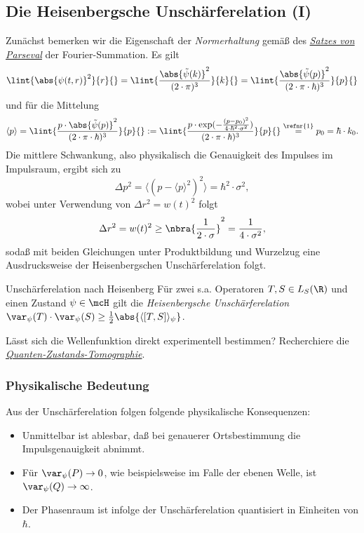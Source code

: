 \documentclass{subfiles}
\begin{document}
    \subsection{Die Heisenbergsche Unschärferelation (I)}
        Zunächst bemerken wir die Eigenschaft der \emph{Normerhaltung} gemäß des \href{https://de.wikipedia.org/wiki/Satz_von_Parseval}{\emph{Satzes von Parseval}} der Fourier-Summation. Es gilt 
        \[
            \lint{\abs{\psi(t,r)}^2}{r}{} = \lint{\frac{\abs{\tilde\psi(k)}^2}{(2\cdot\pi)^3}}{k}{} = \lint{\frac{\abs{\tilde\psi(p)}^2}{(2\cdot\pi\cdot\hbar)^3}}{p}{}
        \]
        und für die Mittelung
        \[\langle p\rangle = \lint{\frac{p\cdot\abs{\tilde\psi(p)}^2}{(2\cdot\pi\cdot\hbar)^3}}{p}{} := \lint{\frac{p\cdot\exp(-\frac{(p-p_0)^2}{4\cdot\hbar^2\cdot\sigma^2})}{(2\cdot\pi\cdot\hbar)^3}}{p}{} \stackrel{\refnr{1}}{=} p_0 = \hbar\cdot k_0.\]
        Die mittlere Schwankung, also physikalisch die Genauigkeit des Impulses im Impulsraum, ergibt sich zu
        \[\Delta p^2 = \langle (p-\langle p\rangle^2)^2\rangle = \hbar^2\cdot\sigma^2,\]
        wobei unter Verwendung von $\Delta r^2 = w(t)^2$ folgt
        \[\Delta r^2 = w(t)^2\geq \nbra{\frac{1}{2\cdot\sigma}}^2 = \frac{1}{4\cdot\sigma^2},\]
        sodaß mit beiden Gleichungen unter Produktbildung und Wurzelzug eine Ausdrucksweise der Heisenbergschen Unschärferelation folgt.
        \begin{mcor}{Unschärferelation nach Heisenberg}
            Für zwei s.a. Operatoren $T,S\in L_S(\R)$ und einen Zustand $\psi\in\mcH$ gilt die \emph{Heisenbergsche Unschärferelation} $\var_\psi(T)\cdot\var_\psi(S)\geq \frac{1}{2}\abs{\langle[T,S]\rangle_\psi}$.
        \end{mcor}
        \begin{Aufgabe}
            \nr{} Lässt sich die Wellenfunktion direkt experimentell bestimmen? Recherchiere die \href{https://de.wikipedia.org/wiki/Quantentomographie}{\emph{Quanten-Zustands-Tomographie}}.
        \end{Aufgabe}

        \subsubsection*{Physikalische Bedeutung}
            Aus der Unschärferelation folgen folgende physikalische Konsequenzen:
            \begin{itemize}[label=$\to$]
                \item Unmittelbar ist ablesbar, daß bei genauerer Ortsbestimmung die Impulsgenauigkeit abnimmt. 
                \item Für $\var_\psi(P)\to 0$, wie beispielsweise im Falle der ebenen Welle, ist $\var_\psi(Q)\to \infty$. 
                \item Der Phasenraum ist infolge der Unschärferelation quantisiert in Einheiten von $\hbar$.
            \end{itemize}
\end{document}
